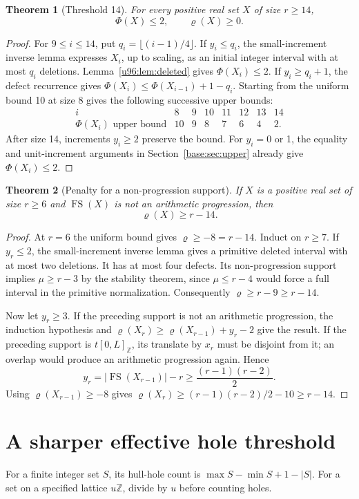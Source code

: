 \documentclass[11pt,a4paper]{article}
\newtheorem{theorem}{Theorem}[section]
\theoremstyle{remark}
\newcommand{\FS}{\operatorname{FS}}
\newcommand{\rhoD}{\varrho}
\begin{document}
\begin{theorem}[Threshold 14]\label{u96:thm:phi14}
For every positive real set $X$ of size $r\geq14$,
\[
\boxed{\Phi(X)\leq2,\qquad\rhoD(X)\geq0.}
\]
\end{theorem}
\begin{proof}
For $9\leq i\leq14$, put $q_i=\lfloor(i-1)/4\rfloor$.
If $y_i\leq q_i$, the small-increment inverse lemma expresses $X_i$, up to
scaling, as an initial integer interval with at most $q_i$ deletions.
Lemma~\ref{u96:lem:deleted} gives $\Phi(X_i)\leq2$.
If $y_i\geq q_i+1$, the defect recurrence gives
$\Phi(X_i)\leq\Phi(X_{i-1})+1-q_i$.
Starting from the uniform bound 10 at size 8 gives the following successive
upper bounds:
\[
\begin{array}{c|rrrrrrr}
i&8&9&10&11&12&13&14\\\hline
\Phi(X_i)\text{ upper bound}&10&9&8&7&6&4&2.
\end{array}
\]
After size 14, increments $y_i\geq2$ preserve the bound. For $y_i=0$ or 1,
the equality and unit-increment arguments in Section~\ref{base:sec:upper}
already give $\Phi(X_i)\leq2$.
\end{proof}

\begin{theorem}[Penalty for a non-progression support]\label{u96:thm:nonap}
If $X$ is a positive real set of size $r\geq6$ and $\FS(X)$ is not an
arithmetic progression, then
\[
\boxed{\rhoD(X)\geq r-14.}
\]
\end{theorem}
\begin{proof}
At $r=6$ the uniform bound gives $\rhoD\geq-8=r-14$.
Induct on $r\geq7$. If $y_r\leq2$, the small-increment inverse lemma gives
a primitive deleted interval with at most two deletions. It has at most
four defects. Its non-progression support implies $\mu\geq r-3$ by the
stability theorem, since $\mu\leq r-4$ would force a full interval in the
primitive normalization. Consequently $\rhoD\geq r-9\geq r-14$.

Now let $y_r\geq3$. If the preceding support is not an arithmetic
progression, the induction hypothesis and
$\rhoD(X_r)\geq\rhoD(X_{r-1})+y_r-2$ give the result.
If the preceding support is $t[0,L]_{\mathbb Z}$, its translate by $x_r$
must be disjoint from it; an overlap would produce an arithmetic progression
again. Hence
\[
y_r=|\FS(X_{r-1})|-r\geq\frac{(r-1)(r-2)}2.
\]
Using $\rhoD(X_{r-1})\geq-8$ gives
$\rhoD(X_r)\geq (r-1)(r-2)/2-10\geq r-14$.
\end{proof}

\section{A sharper effective hole threshold}\label{u96:sec:holes}
For a finite integer set $S$, its hull-hole count is
$\max S-\min S+1-|S|$. For a set on a specified lattice $u\mathbb Z$,
divide by $u$ before counting holes.
\end{document}
